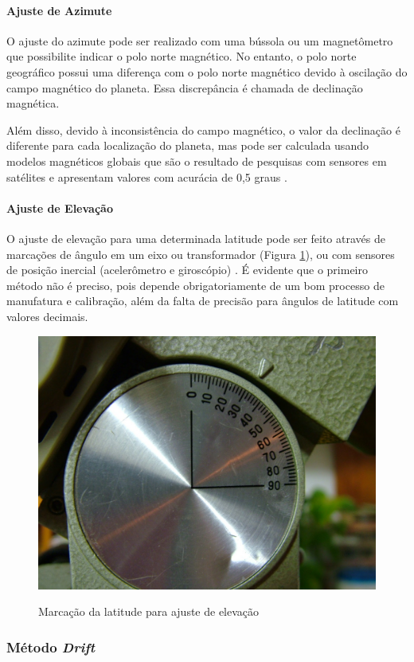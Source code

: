 \paragraph{Ajuste de Azimute}
O ajuste do azimute pode ser realizado com uma bússola ou um magnetômetro que possibilite indicar o polo norte magnético. No entanto, o polo norte geográfico possui uma diferença com o polo norte magnético devido à oscilação do campo magnético do planeta. Essa discrepância é chamada de declinação magnética. 

Além disso, devido à inconsistência do campo magnético, o valor da declinação é diferente para cada localização do planeta, mas pode ser calculada usando modelos magnéticos globais que são o resultado de pesquisas com sensores em satélites e apresentam valores com acurácia de 0,5 graus \cite{site:noicDecMag}.

\paragraph{Ajuste de Elevação}
O ajuste de elevação para uma determinada latitude pode ser feito através de marcações de ângulo em um eixo ou transformador (Figura \ref{fig:marcacao_latitude}), ou com sensores de posição inercial (acelerômetro e giroscópio) \cite{site:driftLupus}. É evidente que o primeiro método não é preciso, pois depende obrigatoriamente de um bom processo de manufatura e calibração, além da falta de precisão para ângulos de latitude com valores decimais. 

\begin{figure}[!htb]
	\centering
	\caption{Marcação da latitude para ajuste de elevação}
	\includegraphics[width=0.45\linewidth]{figuras/revisaobiblio/marcacao_latitude}
	\label{fig:marcacao_latitude}
\end{figure}

\subsubsection{Método \textit{Drift}}

